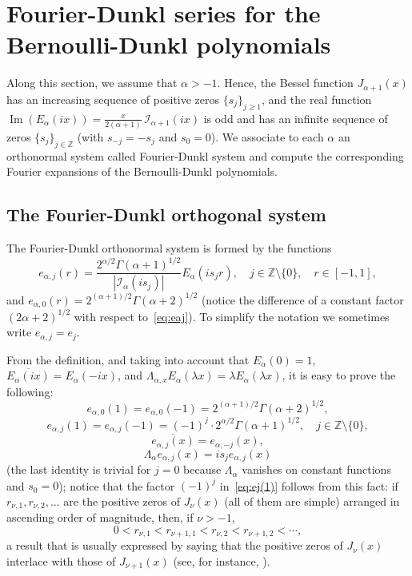 \documentclass[10pt,a4paper]{article}
\theoremstyle{plain}
\theoremstyle{definition}
\numberwithin{equation}{section} %
\newcommand{\Ea}{E_{\alpha}}
\newcommand{\La}{\Lambda_{\alpha}}
\newcommand{\I}{\mathcal{I}}
\newcommand{\ZZ}{\mathbb{Z}}
\newcommand{\ZZO}{\mathbb{Z} \setminus \{0\}}
\renewcommand{\Im}{\operatorname{Im}}
\begin{document}

\section{Fourier-Dunkl series for the Bernoulli-Dunkl polynomials}

Along this section, we assume that $\alpha>-1$. Hence,  the Bessel function $J_{\alpha+1}(x)$ has an
increasing sequence of positive zeros $\{s_j\}_{j\ge1}$, and the real function
$\Im(\Ea(ix)) = \frac{x}{2(\alpha+1)}\,\I_{\alpha+1}(ix)$
is odd and has an infinite sequence of zeros $\{s_j\}_{j\in \ZZ}$
(with $s_{-j} = -s_j$ and $s_0 = 0$).
We associate to each $\alpha$ an orthonormal system called Fourier-Dunkl system and compute the corresponding Fourier expansions of the Bernoulli-Dunkl polynomials.

\subsection{The Fourier-Dunkl orthogonal system}

The Fourier-Dunkl orthonormal system  is formed by the functions
\begin{equation}
\label{eq:eaj}
  e_{\alpha,j}(r) = \frac{2^{\alpha/2}\Gamma(\alpha+1)^{1/2}}
    {|\I_{\alpha}(is_j)|} \Ea(is_j r),
  \quad j\in \ZZO, \quad r \in [-1,1],
\end{equation}
and $e_{\alpha,0}(r) = 2^{(\alpha+1)/2}\Gamma(\alpha+2)^{1/2}$ (notice the difference of a constant factor $(2\alpha+2)^{1/2}$ with respect to~\eqref{eq:eaj}).
To simplify the notation we sometimes write $e_{\alpha,j} = e_j$.

From the definition, and taking into account that
$\Ea(0) = 1$, $\overline{\Ea(ix)} = \Ea(-ix)$,
and
$\Lambda_{\alpha,x} \Ea(\lambda x) = \lambda \Ea(\lambda x)$,
it is easy to prove the following:
\[
  e_{\alpha,0}(1) = e_{\alpha,0}(-1) = 2^{(\alpha+1)/2}\Gamma(\alpha+2)^{1/2},
\]
\begin{equation}
\label{eq:ej(1)}
  e_{\alpha,j}(1) = e_{\alpha,j}(-1) = (-1)^j \cdot 2^{\alpha/2}\Gamma(\alpha+1)^{1/2},
  \quad j \in \ZZO,
\end{equation}
\[
  \overline{e_{\alpha,j}(x)} = e_{\alpha,-j}(x),
\]
\begin{equation}
\label{eq:Lambdaej}
  \La e_{\alpha,j}(x) = is_j e_{\alpha,j}(x)
\end{equation}
(the last identity is trivial for $j=0$ because $\La$ vanishes on constant functions and $s_0=0$); notice that the factor $(-1)^j$ in~\eqref{eq:ej(1)} follows from this fact: if $r_{\nu,1},r_{\nu,2},\dots$ are the positive zeros of $J_\nu(x)$ (all of them are simple) arranged in ascending order of magnitude, then, if $\nu>-1$,
\[
  0 < r_{\nu,1} < r_{\nu+1,1} < r_{\nu,2} < r_{\nu+1,2} < \cdots,
\]
a result that is usually expressed by saying that the positive zeros of $J_\nu(x)$ interlace with those of $J_{\nu+1}(x)$ (see, for instance, \cite[\S\,15.22, p.~479]{Wat}).
\end{document}
